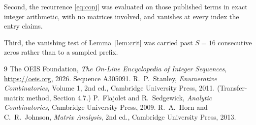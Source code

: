 \documentclass[11pt,a4paper]{article}
\theoremstyle{plain}
\theoremstyle{definition}
\begin{document}
Second, the recurrence \eqref{eq:conj} was evaluated on those published terms in exact
integer arithmetic, with no matrices involved, and vanishes at every index the entry claims.

Third, the vanishing test of Lemma~\ref{lem:crit} was carried past $S=16$ consecutive
zeros rather than to a sampled prefix.

\begin{thebibliography}{9}
 The OEIS Foundation, \emph{The On-Line Encyclopedia of Integer
Sequences}, \url{https://oeis.org}, 2026. Sequence A305091.
 R.~P.~Stanley, \emph{Enumerative Combinatorics}, Volume 1, 2nd ed.,
Cambridge University Press, 2011. (Transfer-matrix method, Section 4.7.)
 P.~Flajolet and R.~Sedgewick, \emph{Analytic Combinatorics}, Cambridge
University Press, 2009.
 R.~A.~Horn and C.~R.~Johnson, \emph{Matrix Analysis}, 2nd ed., Cambridge
University Press, 2013.
\end{thebibliography}
\end{document}
